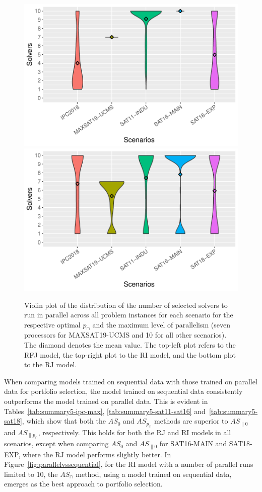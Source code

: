 \begin{table}
\begin{center}
\begin{tabular}{clcccc}
    \bottomrule
    
    \end{tabular}    
\end{center}
\end{table}

\begin{figure}
    \includegraphics[width=0.5\linewidth]{plots/number_of_solvers_infjack_pcap_parallel.pdf}
    \includegraphics[width=0.5\linewidth]{plots/number_of_solvers_jack_pcap_parallel.pdf}

    \caption[Distribution of Number of Selected Solvers when Using $AS_{\parallel p_{\cap}}$]{
    Violin plot of the distribution of the number of selected solvers to run in parallel across all problem instances for each scenario for the respective optimal $p_{\cap}$ and the maximum level of parallelism (seven processors for MAXSAT19-UCMS and 10 for all other scenarios). The diamond denotes the mean value. The top-left plot refers to the RFJ model, the top-right plot to the RI model, and the bottom plot to the RJ model.
    }
    \label{fig:numberofsolvers_kl}
\end{figure}

When comparing models trained on sequential data with those trained on parallel data for portfolio selection, the model trained on sequential data consistently outperforms the model trained on parallel data. This is evident in Tables~\ref{tab:summary5-ipc-max}, \ref{tab:summary5-sat11-sat16} and~\ref{tab:summary5-sat18}, which show that both the $AS_0$ and $AS_{p_{\cap}}$ methods are superior to $AS_{\parallel 0}$ and $AS_{\parallel p_{\cap}}$, respectively. This holds for both the RJ and RI models in all scenarios, except when comparing $AS_0$ and $AS_{\parallel 0}$ for SAT16-MAIN and SAT18-EXP, where the RJ model performs slightly better. In Figure~\ref{fig:parallelvssequential}, for the RI model with a number of parallel runs limited to 10, the $AS_{\cap}$ method, using a model trained on sequential data, emerges as the best approach to portfolio selection.


